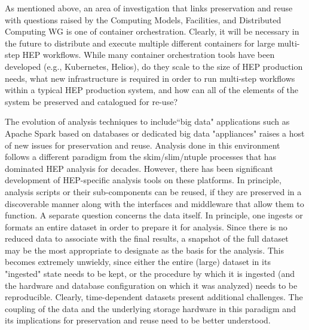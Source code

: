 \documentclass[11pt]{article}
\begin{document}
As mentioned above, an area of investigation that links preservation and reuse with questions raised by the Computing Models, Facilities, and Distributed Computing WG is one of container orchestration.  Clearly, it will be necessary in the future to distribute and execute multiple different containers for large multi-step HEP workflows.  While many container orchestration tools have been developed (e.g., Kubernetes, Helios), do they scale to the size of HEP production needs, what new infrastructure is required in order to run multi-step workflows within a typical HEP production system, and how can all of the elements of the system be preserved and catalogued for re-use?

The evolution of analysis techniques to include``big data" applications such as Apache Spark based on databases or dedicated big data "appliances" raises a host of new issues for preservation and reuse.  Analysis done in this environment follows a different paradigm from the skim/slim/ntuple processes that has dominated HEP analysis for decades.  However, there has been significant development of HEP-specific analysis tools on these platforms\cite{DIANA}.  In principle, analysis scripts or their sub-components can be reused, if they are preserved in a discoverable manner along with the interfaces and middleware that allow them to function. A separate question concerns the data itself.  In principle, one ingests or formats an entire dataset in order to prepare it for analysis.  Since there is no reduced data to associate with the final results, a snapshot of the full dataset may be the most appropriate to designate as the basis for the analysis.  This becomes extremely unwieldy, since either the entire (large) dataset in its "ingested" state needs to be kept, or the procedure by which it is ingested (and the hardware and database configuration on which it was analyzed) needs to be reproducible. Clearly, time-dependent datasets present additional challenges. The coupling of the data and the underlying storage hardware in this paradigm and its implications for preservation and reuse need to be better understood.
\end{document}
